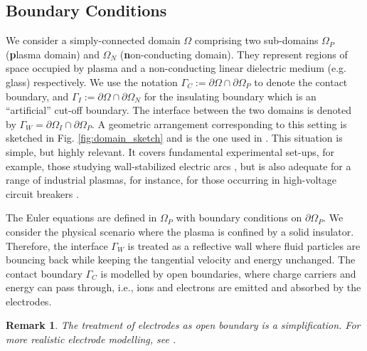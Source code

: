 \documentclass{article}
\newtheorem*{remark}{Remark}
\begin{document}
\subsection{Boundary Conditions} \label{sec:BC}

We consider a simply-connected domain $\Omega$ comprising two sub-domains $\Omega_P$
(\textbf{p}lasma domain) and $\Omega_N$ (\textbf{n}on-conducting domain). They represent
regions of space occupied by plasma and a non-conducting linear dielectric medium
(e.g. glass) respectively. We use the notation
$\Gamma_C := \partial\Omega \cap \partial\Omega_P$ to denote the contact boundary, and
$\Gamma_I := \partial\Omega \cap \partial\Omega_N$ for the insulating boundary which is an
``artificial'' cut-off boundary. The interface between the two domains is denoted by
$\Gamma_W = \partial\Omega_I \cap \partial\Omega_P$. A geometric arrangement corresponding
to this setting is sketched in Fig. \ref{fig:domain_sketch} and is the one used in
\cite[][Ch. 1, Sec. 4]{fuchs_2021}. This situation is simple, but highly relevant. It
covers fundamental experimental set-ups, for example, those studying wall-stabilized
electric arcs \cite{GGF05}, but is also adequate for a range of industrial plasmas, for
instance, for those occurring in high-voltage circuit breakers \cite{SEE15,MGU20}.

The Euler equations are defined in $\Omega_P$ with boundary conditions on
$\partial\Omega_P$. We consider the physical scenario where the plasma is confined by a
solid insulator. Therefore, the interface $\Gamma_W$ is treated as a reflective wall where
fluid particles are bouncing back while keeping the tangential velocity and energy
unchanged. The contact boundary $\Gamma_C$ is modelled by open boundaries, where charge
carriers and energy can pass through, i.e., ions and electrons are emitted and absorbed by
the electrodes.

\begin{remark}
  The treatment of electrodes as open boundary is a simplification. For more realistic
  electrode modelling, see \cite{godyak_1990, parker_1993}.
\end{remark}
\end{document}

